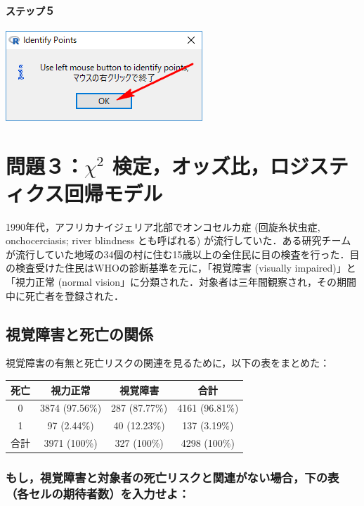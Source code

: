 \documentclass[11pt,]{problemset}
\let\oldparagraph\paragraph
\renewcommand{\paragraph}[1]{\oldparagraph{#1}\mbox{}}
\begin{document}
\paragraph{ステップ５}\label{-16}

\begin{center}\includegraphics[width=0.25\linewidth]{pic/scatter07} \end{center}

\section{\texorpdfstring{問題３：\(\chi^2\)
検定，オッズ比，ロジスティクス回帰モデル}{問題３：\textbackslash{}chi\^{}2 検定，オッズ比，ロジスティクス回帰モデル}}\label{chi2-}

1990年代，アフリカナイジェリア北部でオンコセルカ症 (回旋糸状虫症,
onchocerciasis; river blindness とも呼ばれる)
が流行していた．ある研究チームが流行していた地域の34個の村に住む15歳以上の全住民に目の検査を行った．目の検査受けた住民はWHOの診断基準を元に，「視覚障害
(visually impaired)」と「視力正常 (normal
vision」に分類された．対象者は三年間観察され，その期間中に死亡者を登録された．

\subsection{視覚障害と死亡の関係}

視覚障害の有無と死亡リスクの関連を見るために，以下の表をまとめた：

\begin{center}
\begin{tabular}{|c|c|c|c|}
\hline
死亡 & 視力正常           & 視覚障害          & 合計             \\ \hline
0  & 3874 (97.56\%) & 287 (87.77\%) & 4161 (96.81\%) \\ \hline
1  & 97 (2.44\%)    & 40 (12.23\%)  & 137 (3.19\%)   \\ \hline
合計 & 3971 (100\%)   & 327 (100\%)   & 4298 (100\%)   \\ \hline
\end{tabular}
\end{center}

\subsubsection{もし，視覚障害と対象者の死亡リスクと関連がない場合，下の表（各セルの期待者数）を入力せよ：}
\end{document}
